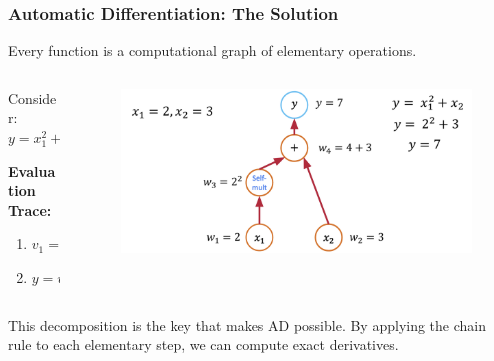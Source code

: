 \documentclass[notes]{beamer}
\begin{document}
\begin{frame}
	\frametitle{Automatic Differentiation: The Solution}
	
	Every function is a computational graph of elementary operations.
	
	\begin{columns}[T]
		\begin{column}{0.35\textwidth}
			Consider: $y = x_1^2 + x_2$

			\vspace{1em}

			\textbf{Evaluation Trace:}
			\begin{enumerate}
				\item $v_1 = x_1^2$
				\item $y = v_1 + x_2$
			\end{enumerate}
			
		\end{column}
		\begin{column}{0.65\textwidth}
			\begin{figure}[ht]
				\centering
				\includegraphics[width=\linewidth]{figs/ad3.png}
			\end{figure}
		\end{column}
	\end{columns}
	\vspace{1em}
	This decomposition is the key that makes AD possible. By applying the chain rule to each elementary step, we can compute exact derivatives.
\end{frame}

\end{document}
